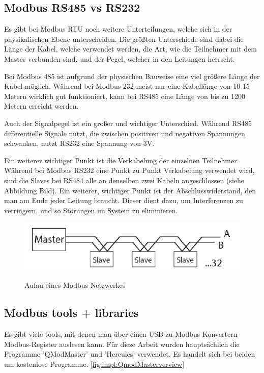 \subsection{Modbus RS485 vs RS232} 
Es gibt bei Modbus RTU noch weitere Unterteilungen, welche sich in der physikalischen Ebene unterscheiden. Die größten Unterschiede sind dabei die Länge der Kabel, welche verwendet werden, die Art, wie die Teilnehmer mit dem Master verbunden sind, und der Pegel, welcher in den Leitungen herrscht.   

Bei Modbus 485 ist aufgrund der physischen Bauweise eine viel größere Länge der Kabel möglich. Während bei Modbus 232 meist nur eine Kabellänge von 10-15 Metern wirklich gut funktioniert, kann bei RS485 eine Länge von bis zu 1200 Metern erreicht werden.   

Auch der Signalpegel ist ein großer und wichtiger Unterschied. Während RS485 differentielle Signale nutzt, die zwischen positiven und negativen Spannungen schwanken, nutzt RS232 eine Spannung von 3V.   

Ein weiterer wichtiger Punkt ist die Verkabelung der einzelnen Teilnehmer. Während bei Modbus RS232 eine Punkt zu Punkt Verkabelung verwendet wird, sind die Slaves bei RS484 alle an denselben zwei Kabeln angeschlossen (siehe Abbildung Bild). Ein weiterer, wichtiger Punkt ist der Abschlusswiderstand, den man am Ende jeder Leitung braucht. Dieser dient dazu, um Interferenzen zu verringern, und so Störungen im System zu eliminieren.  
\cite{UnterschiedeinModbus}



\begin{figure}[h t] \cite{modbusaufbauimg}
    \centering
    \includegraphics[scale=0.5]{pics/RS485-Schnittstelle-11.png}
    \caption{Aufau eines Modbus-Netzwerkes}
    \label{fig:impl:WallboxModbusnetzwerk}
\end{figure}

\subsection{Modbus tools + libraries} 

Es gibt viele tools, mit denen man über einen USB zu Modbus Konvertern Modbus-Register auslesen kann. Für diese Arbeit wurden hauptsächlich die Programme 'QModMaster' und 'Hercules' verwendet. Es handelt sich bei beiden um kostenlose Programme.  \ref{fig:impl:QmodMasterverview}

